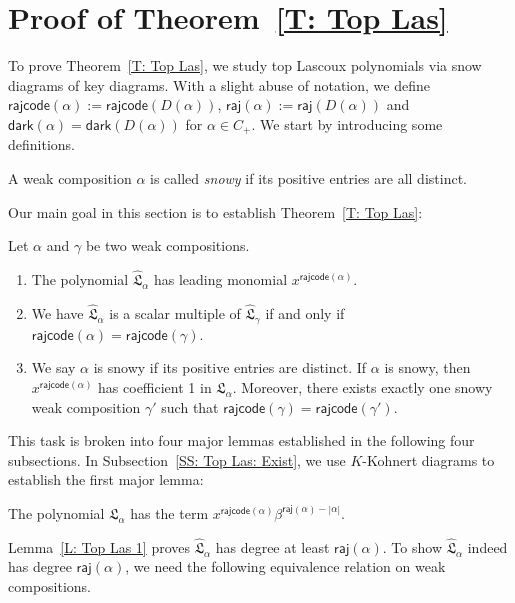 \documentclass[ALCO]{cedram}
\newenvironment{manualtheorem}[1]{
  \renewcommand\themanualtheoreminner{#1}
  \manualtheoreminner
}{\endmanualtheoreminner}
\newcommand{\fL}{\mathfrak{L}}
\newcommand{\fLb}{\fL}
\newcommand{\topLas}{\widehat{\fL}}
\newcommand{\dark}{\mathsf{dark}}
\newcommand{\rajcode}{\mathsf{rajcode}}
\newcommand{\raj}{\mathsf{raj}}
\newcommand{\definition}[1]{{\color{darkred}\emph{#1}}}
\begin{document}
\section{Proof of Theorem~\ref{T: Top Las}}
\label{S: weak composition}

To prove Theorem~\ref{T: Top Las},
we study top Lascoux polynomials via snow diagrams of key diagrams.
With a slight abuse of notation, we
define $\rajcode(\alpha) := \rajcode(D(\alpha))$, $\raj(\alpha) := \raj(D(\alpha))$
and $\dark(\alpha) = \dark(D(\alpha))$
for $\alpha \in C_+$.
We start by introducing some definitions.

\begin{defn}
A weak composition $\alpha$ is called \definition{snowy}
if its positive entries are all distinct. 
\end{defn}

Our main goal in this section is to establish 
Theorem~\ref{T: Top Las}:

\begin{manualtheorem}{\ref{T: Top Las}}
Let $\alpha$ and $\gamma$ be two weak compositions. 
\begin{enumerate}
\item[(a)]
The polynomial $\topLas_\alpha$ has leading monomial $x^{\rajcode(\alpha)}$.
\item[(b)] We have
$\topLas_\alpha$ is a scalar multiple of $\topLas_{\gamma}$
if and only if $\rajcode(\alpha) = \rajcode(\gamma)$.
\item[(c)] 
We say $\alpha$ is snowy if its
positive entries are distinct.
If $\alpha$ is snowy, then $x^{\rajcode(\alpha)}$ has coefficient 1 in $\topLas_\alpha$.
Moreover, 
there exists exactly one snowy weak composition $\gamma'$ 
such that $\rajcode(\gamma) = \rajcode(\gamma')$.
\end{enumerate}  
\end{manualtheorem}

This task is broken into four major lemmas
established in the following four subsections. 
In Subsection~\ref{SS: Top Las: Exist}, 
we use $K$-Kohnert diagrams to establish the first major lemma:

\begin{lemma}
\label{L: Top Las 1}
The polynomial $\fLb_\alpha$ has the term $x^{\rajcode(\alpha)} \beta^{\raj(\alpha) - |\alpha|}$.  
\end{lemma}

 


Lemma~\ref{L: Top Las 1} proves
$\topLas_\alpha$ has degree at least $\raj(\alpha)$.
To show $\topLas_\alpha$ indeed has degree $\raj(\alpha)$,
we need the following equivalence relation on weak compositions. 
\end{document}
